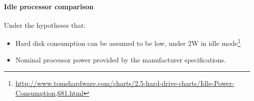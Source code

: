         \paragraph*{Idle processor comparison}
            Under the hypotheses that: 
            
        \begin{itemize}
            \item Hard disk consumption can be assumed to be low, under 2W in idle mode\footnote{\url{http://www.tomshardware.com/charts/2.5-hard-drive-charts/Idle-Power-Consumption,681.html}}
            \item Nominal processor power provided by the manufacturer specifications.
        \end{itemize}


